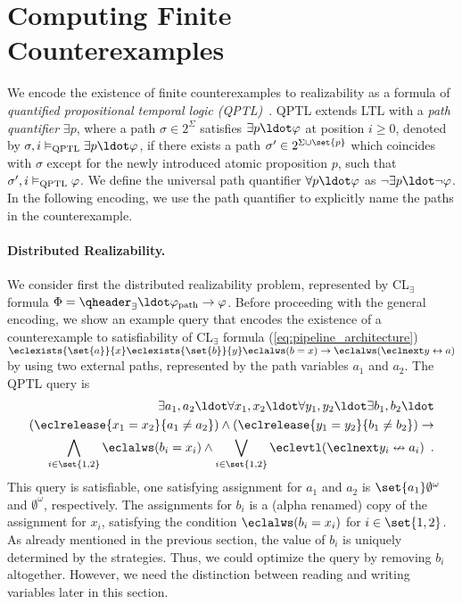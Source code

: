 \documentclass{LMCS}
\newcommand{\modelsqptl}{\vDash_\text{\rm QPTL}}
\theoremstyle{plain}\newtheorem{theorem}[thm]{Theorem}
\theoremstyle{plain}\newtheorem{lemma}[thm]{Lemma}
\theoremstyle{plain}\newtheorem{proposition}[thm]{Proposition}
\theoremstyle{plain}\newtheorem{corollary}[thm]{Corollary}
\theoremstyle{definition}\newtheorem{definition}{Definition}[section]
\begin{document}
\section{Computing Finite Counterexamples} \label{sec:computing_counterexamples}


We encode the existence of finite counterexamples to realizability as a formula of \emph{quantified propositional temporal logic (QPTL)}~\cite{DBLP:conf/lics/KestenP95}. 
QPTL extends LTL with a \emph{path quantifier} $\exists p$, where a path $\sigma \in 2^\Sigma$ satisfies $\exists p \ldot \varphi$ at position $i \geq 0$, denoted by $\sigma,i \modelsqptl \exists p \ldot \varphi$, if there exists a path $\sigma' \in 2^{\Sigma \cup \set{p}}$ which coincides with $\sigma$ except for the newly introduced atomic proposition $p$, such that $\sigma',i \modelsqptl \varphi$.
We define the universal path quantifier $\forall p \ldot \varphi$ as $\neg \exists p \ldot \neg \varphi$.
In the following encoding, we use the path quantifier to explicitly name the paths in the counterexample.

\paragraph{\bf Distributed Realizability.} \label{sec:algorithm_incomplete_information}


We consider first the distributed realizability problem, represented by CL$_\exists$ formula $\Phi = \qheader_\exists \ldot \varphi_{\text{path}} \rightarrow \varphi$.
Before proceeding with the general encoding, we show an example query that encodes the existence of a counterexample to satisfiability of CL$_\exists$ formula (\ref{eq:pipeline_architecture}) $\eclexists{\set{a}}{x} \eclexists{\set{b}}{y} \eclalws (b = x) \rightarrow \eclalws (\eclnext y \leftrightarrow a)$ by using two external paths, represented by the path variables $a_1$ and $a_2$.
The QPTL query is
\begin{align}
  \exists a_1, a_2 \ldot \forall x_1, x_2 \ldot \forall y_1, y_2 \ldot \exists b_1, b_2 \ldot \nonumber \\
  (\eclrelease{x_1 = x_2}{a_1 \neq a_2}) \land (\eclrelease{y_1 = y_2}{b_1 \neq b_2}) \rightarrow \label{eq:qptl_example_consustency} \\
  \bigwedge_{i \in \set{1,2}} \eclalws (b_i = x_i) \land \bigvee_{i \in \set{1,2}} \eclevtl (\eclnext y_i \nleftrightarrow a_i) \enspace.
\end{align}
This query is satisfiable, one satisfying assignment for $a_1$ and $a_2$ is $\set{a_1} \emptyset^\omega$ and $\emptyset^\omega$, respectively.
The assignments for $b_i$ is a (alpha renamed) copy of the assignment for $x_i$, satisfying the condition $\eclalws (b_i = x_i)$ for $i \in \set{1,2}$.
As already mentioned in the previous section, the value of $b_i$ is uniquely determined by the strategies.
Thus, we could optimize the query by removing $b_i$ altogether.
However, we need the distinction between reading and writing variables later in this section.
\end{document}
